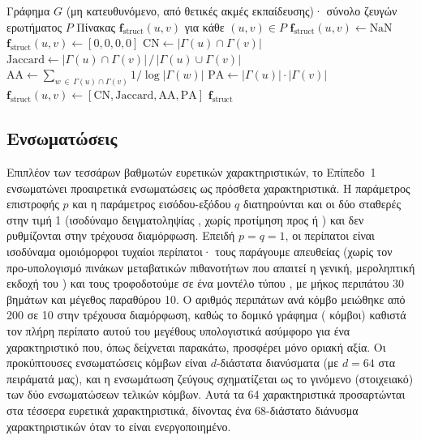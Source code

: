 \begin{algorithm}[h!]
\caption{Υπολογισμός Δομικών Ευρετικών Δεικτών}
\label{alg:heuristics}
\begin{algorithmic}[1]
\Require Γράφημα $G$ (μη κατευθυνόμενο, από θετικές ακμές εκπαίδευσης)· σύνολο
    ζευγών ερωτήματος $P$
\Ensure Πίνακας $\mathbf{f}_{\text{struct}}(u,v)$ για κάθε $(u,v) \in P$
        \State $\mathbf{f}_{\text{struct}}(u,v) \gets \text{NaN}$
        \State $\mathbf{f}_{\text{struct}}(u,v) \gets [0, 0, 0, 0]$
    \Else
        \State $\mathrm{CN} \gets |\Gamma(u) \cap \Gamma(v)|$
        \State $\mathrm{Jaccard} \gets |\Gamma(u) \cap \Gamma(v)| \,/\, |\Gamma(u) \cup \Gamma(v)|$
        \State $\mathrm{AA} \gets \sum_{w \,\in\, \Gamma(u) \cap \Gamma(v)} 1 / \log|\Gamma(w)|$
        \State $\mathrm{PA} \gets |\Gamma(u)| \cdot |\Gamma(v)|$
        \State $\mathbf{f}_{\text{struct}}(u,v) \gets [\mathrm{CN}, \mathrm{Jaccard}, \mathrm{AA}, \mathrm{PA}]$
    \EndIf
\EndFor
\State \Return $\mathbf{f}_{\text{struct}}$
\end{algorithmic}
\end{algorithm}

\subsection{Ενσωματώσεις }
\label{subsec:node2vec}

Επιπλέον των τεσσάρων βαθμωτών ευρετικών χαρακτηριστικών, το Επίπεδο~1
ενσωματώνει προαιρετικά ενσωματώσεις  \cite{grover2016node2vec} ως
πρόσθετα χαρακτηριστικά.
Η παράμετρος επιστροφής $p$ και η παράμετρος
εισόδου-εξόδου $q$ διατηρούνται και οι δύο σταθερές στην τιμή 1 (ισοδύναμο
δειγματοληψίας , χωρίς προτίμηση προς  ή ) και δεν
ρυθμίζονται στην τρέχουσα διαμόρφωση.
Επειδή $p = q = 1$, οι περίπατοι είναι
ισοδύναμα ομοιόμορφοι τυχαίοι περίπατοι· τους παράγουμε απευθείας (χωρίς τον
προ-υπολογισμό πινάκων μεταβατικών πιθανοτήτων που απαιτεί η γενική, μεροληπτική
εκδοχή του ) και τους τροφοδοτούμε σε ένα μοντέλο 
τύπου , με μήκος περιπάτου 30 βημάτων και μέγεθος παραθύρου 10.
Ο
αριθμός περιπάτων ανά κόμβο μειώθηκε από 200 σε 10 στην τρέχουσα διαμόρφωση,
καθώς το δομικό γράφημα (\GraphNodes{} κόμβοι) καθιστά τον πλήρη περίπατο αυτού
του μεγέθους υπολογιστικά ασύμφορο για ένα χαρακτηριστικό που, όπως δείχνεται
παρακάτω, προσφέρει μόνο οριακή αξία.
Οι προκύπτουσες ενσωματώσεις κόμβων είναι
$d$-διάστατα διανύσματα (με $d = 64$ στα πειράματά μας), και η ενσωμάτωση
ζεύγους σχηματίζεται ως το γινόμενο  (στοιχειακό) των δύο
ενσωματώσεων τελικών κόμβων.
Αυτά τα 64 χαρακτηριστικά προσαρτώνται στα
τέσσερα ευρετικά χαρακτηριστικά, δίνοντας ένα 68-διάστατο διάνυσμα
χαρακτηριστικών όταν το  είναι ενεργοποιημένο.

